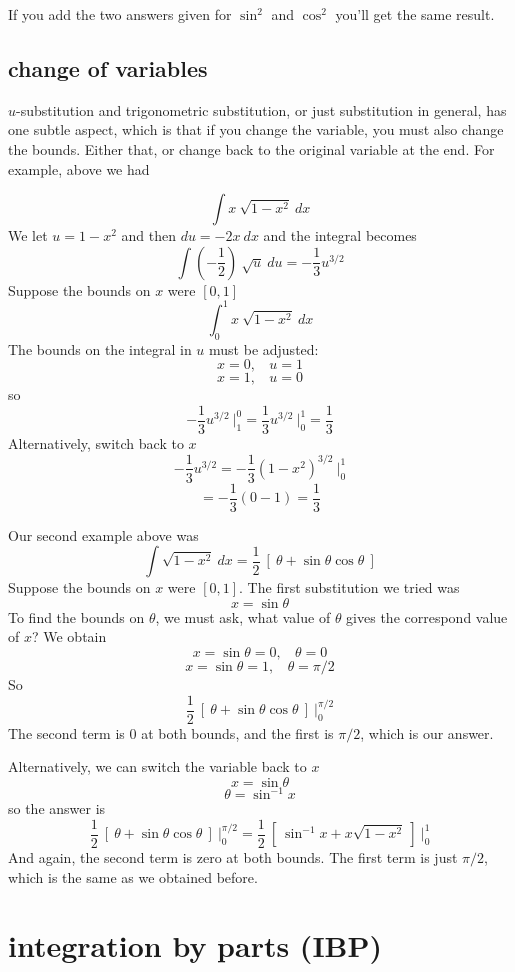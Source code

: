 \documentclass[11pt, oneside]{article}
\begin{document}
If you add the two answers given for $\sin^2$ and $\cos^2$ you'll get the same result.

\subsection*{change of variables}

$u$-substitution and trigonometric substitution, or just substitution in general, has one subtle aspect, which is that if you change the variable, you must also change the bounds.  Either that, or change back to the original variable at the end.  For example, above we had

\[ \int x \ \sqrt{1-x^2}  \ dx \]
We let $u = 1-x^2$ and then $du = -2x \ dx$ and the integral becomes
\[ \int (- \frac{1}{2}) \ \sqrt{u} \ du = - \frac{1}{3} u^{3/2} \]
Suppose the bounds on $x$ were $[0,1]$
\[ \int_0^1 x \ \sqrt{1-x^2}  \ dx \]
The bounds on the integral in $u$ must be adjusted:
\[ x = 0, \ \ \ \ u = 1 \]
\[ x = 1, \ \ \ \ u = 0 \]
so
\[ - \frac{1}{3} u^{3/2} \ \bigg |_1^0 = \frac{1}{3} u^{3/2} \ \bigg |_0^1 = \frac{1}{3} \]
Alternatively, switch back to $x$
\[  - \frac{1}{3} u^{3/2} = - \frac{1}{3} (1-x^2)^{3/2} \ \bigg |_0^1 \]
\[ = - \frac{1}{3} (0 - 1) = \frac{1}{3} \]

Our second example above was
\[ \int \sqrt{1 - x^2} \ dx = \frac{1}{2} \ [ \ \theta + \sin \theta \cos \theta \ ] \]
Suppose the bounds on $x$ were $[0,1]$.  The first substitution we tried was 
\[ x = \sin \theta \]
To find the bounds on $\theta$, we must ask, what value of $\theta$ gives the correspond value of $x$?  We obtain
\[ x = \sin \theta = 0, \ \ \ \  \theta = 0 \]
\[ x = \sin \theta = 1, \ \ \ \  \theta = \pi/2 \]
So
\[  \frac{1}{2} \ [ \ \theta + \sin \theta \cos \theta \ ] \ \bigg |_0^{\pi/2} \]
The second term is $0$ at both bounds, and the first is $\pi/2$, which is our answer.

Alternatively, we can switch the variable back to $x$
\[ x = \sin \theta \]
\[ \theta = \sin^{-1} x \]
so the answer is
\[  \frac{1}{2} \ [ \ \theta + \sin \theta \cos \theta \ ]  \ \bigg |_0^{\pi/2} = \frac{1}{2} \ [ \ \sin^{-1} x + x \sqrt{1-x^2} \ ]  \ \bigg |_0^{1} \] 
And again, the second term is zero at both bounds.  The first term is just $\pi/2$, which is the same as we obtained before.

\section*{integration by parts (IBP)}
\end{document}
